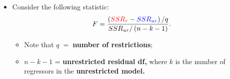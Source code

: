 \documentclass[notes=show,compress,beamer]{beamer}
\begin{document}
\begin{frame}[shrink]
\begin{itemize}
\begin{itemize}
\item Let%
\color{red}
$SSR_{r}$ 
\color{black}%
denote the Residual Sum-of-Squares of the 
\color{red}%
restricted model 
\color{black}%
.
\end{itemize}

\item Consider the following statistic:%
\begin{equation*}
F=\frac{\left( 
\color{red}%
SSR_{r}%
\color{black}%
-%
\color{blue}%
SSR_{ur}%
\color{black}%
\right) /q}{SSR_{ur}/\left( n-k-1\right) }.
\end{equation*}%
\pause%

\begin{itemize}
\item Note that $q$\textbf{\ }=\textbf{\ number of restrictions};

\item $n-k-1$ = \textbf{unrestricted residual df, }where $k$ is the number
of regressors in the \textbf{unrestricted model.}
\end{itemize}
\end{itemize}

\end{frame}%
\end{document}
